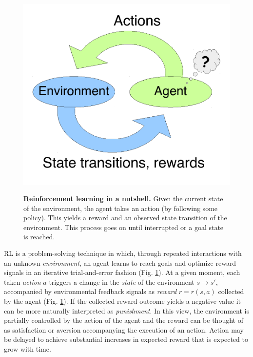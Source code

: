 \documentclass[10pt,letterpaper]{article}
\begin{document}
\begin{figure}
  \caption{\textbf{Reinforcement learning in a nutshell.} Given the current state of the environment,
    the agent takes an action (by following some policy). This yields a reward and an observed
    state transition of the environment. This process goes on until interrupted or a goal state is reached.}
  \centering
  \includegraphics[width=1.\linewidth]{rl.pdf}
  \label{fig:rl}
\end{figure}


RL is a problem-solving technique in which,
through repeated interactions with an unknown \textit{environment},
an agent learns to reach goals and optimize reward signals
in an iterative trial-and-error fashion (Fig. \ref{fig:rl}).
At a given moment, each taken \textit{action} $a$ triggers a change
in the \textit{state} of the environment
$s \rightarrow s'$, accompanied by environmental feedback signals as \textit{reward}
$r = r(s, a)$ collected by the agent (Fig. \ref{fig:rl}).
If the collected reward outcome yields a negative value it can be
more naturally interpreted as \textit{punishment}.
In this view, the environment is partially controlled by
the action of the agent and the reward can be thought
of as satisfaction \textemdash or aversion \textemdash accompanying the execution of
an action.
Action may be delayed to achieve substantial increases in expected reward
that is expected to grow with time.
\end{document}
